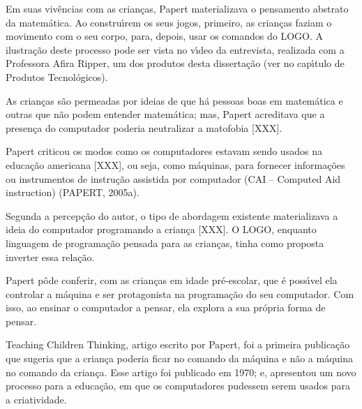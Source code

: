 \documentclass[
12pt,		%
openright,	%
twoside,  %
a4paper,			%
chapter=TITLE,		%
english,			%
french,				%
spanish,			%
brazil				%
]{USPSC-classe/USPSC}
\begin{document}
Em suas viv\^encias com as crian\c{c}as, Papert materializava o pensamento abstrato da matem\'atica. Ao constru\'{\i}rem os seus jogos, primeiro, as crian\c{c}as faziam o movimento com o seu corpo, para, depois, usar os comandos do LOGO. A ilustra\c{c}\~ao deste processo pode ser vista no v\'{\i}deo  da entrevista, realizada com a Professora Afira Ripper,  um dos produtos desta disserta\c{c}\~ao (ver no cap\'{\i}tulo de Produtos Tecnol\'ogicos).









As crian\c{c}as s\~ao permeadas por ideias de que h\'a pessoas boas em matem\'atica e outras que n\~ao podem entender matem\'atica; mas, Papert acreditava que a presen\c{c}a do computador poderia neutralizar a matofobia [XXX].









Papert criticou os modos como os computadores estavam sendo usados na educa\c{c}\~ao americana [XXX], ou seja, como m\'aquinas, para fornecer informa\c{c}\~oes ou instrumentos de instru\c{c}\~ao assistida por computador (CAI – Computed Aid instruction)  (PAPERT, 2005a).









Segunda a percep\c{c}\~ao do autor, o tipo de abordagem existente materializava a ideia do computador programando a crian\c{c}a [XXX]. O LOGO, enquanto linguagem de programa\c{c}\~ao pensada para as crian\c{c}as, tinha como proposta inverter essa rela\c{c}\~ao.









Papert p\^ode conferir, com as crian\c{c}as em idade pr\'e-escolar, que \'e poss\'{\i}vel ela controlar a m\'aquina e ser protagonista na programa\c{c}\~ao do seu computador. Com isso, ao ensinar o computador a pensar, ela explora a sua pr\'opria forma de pensar.









Teaching Children Thinking, artigo escrito por Papert, foi a primeira publica\c{c}\~ao que sugeria que a crian\c{c}a poderia ficar no comando da m\'aquina e n\~ao a m\'aquina no comando da crian\c{c}a.  Esse artigo  foi publicado em 1970; e,  apresentou um novo processo para a educa\c{c}\~ao, em que os computadores pudessem serem usados para a criatividade.
\end{document}

